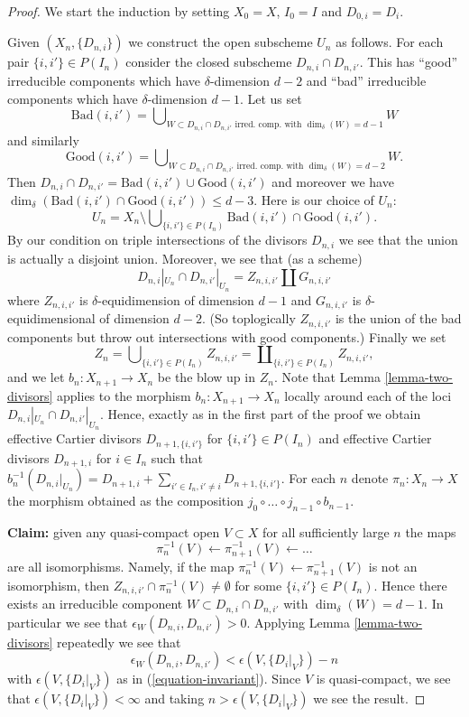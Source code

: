 \begin{proof}
\medskip\noindent
We start the induction by setting $X_0 = X$,
$I_0 = I$ and $D_{0, i} = D_i$.

\medskip\noindent
Given $(X_n, \{D_{n, i}\})$ we construct the open subscheme
$U_n$ as follows. For each pair $\{i, i'\} \in P(I_n)$ consider
the closed subscheme $D_{n, i} \cap D_{n, i'}$. This has ``good''
irreducible components which have $\delta$-dimension $d - 2$ and
``bad'' irreducible components which have $\delta$-dimension $d - 1$.
Let us set
$$
\text{Bad}(i, i')
=
\bigcup\nolimits_{W \subset D_{n, i} \cap D_{n, i'}
\text{ irred.\ comp. with }\dim_\delta(W) = d - 1} W
$$
and similarly
$$
\text{Good}(i, i')
=
\bigcup\nolimits_{W \subset D_{n, i} \cap D_{n, i'}
\text{ irred.\ comp. with }\dim_\delta(W) = d - 2} W.
$$
Then $D_{n, i} \cap D_{n, i'} = \text{Bad}(i, i') \cup \text{Good}(i, i')$
and moreover we have
$\dim_\delta(\text{Bad}(i, i') \cap \text{Good}(i, i')) \leq d - 3$.
Here is our choice of $U_n$:
$$
U_n
=
X_n
\setminus
\bigcup\nolimits_{\{i, i'\} \in P(I_n)}
\text{Bad}(i, i') \cap \text{Good}(i, i').
$$
By our condition on triple intersections of the divisors $D_{n, i}$
we see that the union is actually a disjoint union. Moreover,
we see that (as a scheme)
$$
D_{n, i}|_{U_n} \cap D_{n, i'}|_{U_n}
=
Z_{n, i, i'} \coprod G_{n, i, i'}
$$
where $Z_{n, i, i'}$ is $\delta$-equidimension of dimension $d - 1$
and $G_{n, i, i'}$ is $\delta$-equidimensional of dimension $d - 2$.
(So toplogically $Z_{n, i, i'}$ is the union of the bad components
but throw out intersections with good components.) Finally we set
$$
Z_n =
\bigcup\nolimits_{\{i, i'\} \in P(I_n)} Z_{n, i, i'} =
\coprod\nolimits_{\{i, i'\} \in P(I_n)} Z_{n, i, i'},
$$
and we let $b_n : X_{n + 1} \to X_n$ be the blow up in $Z_n$.
Note that Lemma \ref{lemma-two-divisors}
applies to the morphism $b_n : X_{n + 1} \to X_n$ locally around
each of the loci $D_{n, i}|_{U_n} \cap D_{n, i'}|_{U_n}$. Hence,
exactly as in the first part of the proof we obtain effective
Cartier divisors $D_{n + 1, \{i, i'\}}$ for $\{i, i'\} \in P(I_n)$
and effective Cartier divisors $D_{n + 1, i}$ for $i \in I_n$
such that
$b_n^{-1}(D_{n, i}|_{U_n}) = D_{n + 1, i} +
\sum\nolimits_{i' \in I_n, i' \not = i} D_{n + 1, \{i, i'\}}$.
For each $n$ denote $\pi_n : X_n \to X$ the morphism obtained
as the composition $j_0 \circ \ldots \circ j_{n - 1} \circ b_{n - 1}$.

\medskip\noindent
{\bf Claim:} given any quasi-compact open $V \subset X$
for all sufficiently large $n$ the maps
$$
\pi_n^{-1}(V) \leftarrow \pi_{n + 1}^{-1}(V) \leftarrow \ldots
$$
are all isomorphisms. Namely, if the map
$\pi_n^{-1}(V) \leftarrow \pi_{n + 1}^{-1}(V)$ is not an isomorphism,
then $Z_{n, i, i'} \cap \pi_n^{-1}(V) \not = \emptyset$ for some
$\{i, i'\} \in P(I_n)$. Hence there exists an irreducible component
$W \subset D_{n, i} \cap D_{n, i'}$ with $\dim_\delta(W) = d - 1$.
In particular we see that $\epsilon_W(D_{n, i}, D_{n, i'}) > 0$.
Applying Lemma \ref{lemma-two-divisors} repeatedly we see that
$$
\epsilon_W(D_{n, i}, D_{n, i'})
<
\epsilon(V, \{D_i|_V\}) - n
$$
with $\epsilon(V, \{D_i|_V\})$ as in (\ref{equation-invariant}).
Since $V$ is quasi-compact, we see that
$\epsilon(V, \{D_i|_V\}) < \infty$ and taking $n > \epsilon(V, \{D_i|_V\})$
we see the result.


\end{proof}
